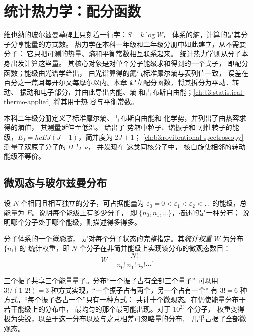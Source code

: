 \chapter{统计热力学：配分函数}\label{ch:b3:partition-functions}

维也纳的玻尔兹曼墓碑上只刻着一行字：$S = k\log W$，
体系的熵，计算的是其分子分享能量的方式数。
热力学在本科一年级和二年级分册中如此建立，从不需要分子：
它只把可测的热量、熵和平衡常数相互联系起来。
统计热力学则从分子本身出发计算这些量。
其核心对象是对单个分子能级求和得到的一个式子，
即配分函数；能级由光谱学给出，
由光谱算得的氮气标准摩尔熵与表列值一致，
误差在百分之一焦耳每开尔文每摩尔以内。本章
建立配分函数，将其拆分为平动、转动、
振动和电子部分，并由此导出内能、熵
和吉布斯自由能；\cref{ch:b3:statistical-thermo-applied} 将其用于热
容与平衡常数。

\begin{recall}
本科二年级分册定义了标准摩尔熵、吉布斯自由能和
化学势，并列出了由热容求得的熵值，
其测量延伸至低温。 给出了
势箱中粒子、谐振子和
刚性转子的能级，$E_J = hcBJ(J+1)$，简并度为 $2J + 1$；
\cref{ch:b3:rovibrational-spectroscopy} 测量了双原子分子的 $B$ 与 $\tilde\nu$，
并发现在  这类同核分子中，
核自旋使相邻的转动能级不等价。
\end{recall}

\section{微观态与玻尔兹曼分布}

设 $N$ 个相同且相互独立的分子，可占据能量为
$\varepsilon_0 = 0 < \varepsilon_1 < \varepsilon_2 < \dots$ 的能级，总能量为 $E$。说明每个能级上有多少分子，
即 $\{n_0, n_1, \dots\}$，描述的是一种分布；
说明哪个分子处于哪个能级，则描述得多得多。

\begin{definition}\label{def:b3:partition-functions:microstate}
分子体系的一个\emph{微观态}，
是对每个分子状态的完整指定。其\emph{统计权重}
$W$ 为分布 $\{n_i\}$ 的
统计权重，即 $N$ 个分子在非简并能级上实现该分布的微观态数目：
\[
  W = \frac{N!}{n_0!\,n_1!\,n_2!\cdots}.
\]
\end{definition}

\begin{example}[三个振子共享三个量子]\label{ex:b3:partition-functions:three-quanta}
三个振子共享三个能量量子。分布“一个振子占有全部三个量子”
可以用 $3!/(1!\,2!) = 3$ 种方式实现，“一个振子占有两个，另一个占有一个”
有 $3! = 6$ 种方式，“每个振子各占一个”只有一种方式：
共计十个微观态。在仍使能量分布于若干能级上的分布中，
最均匀的那个最可能出现。对于 $10^{23}$ 个分子，
权重变得极为尖锐，以至于这一分布以及与之只相差可忽略量的分布，
几乎占据了全部微观态。
\end{example}


